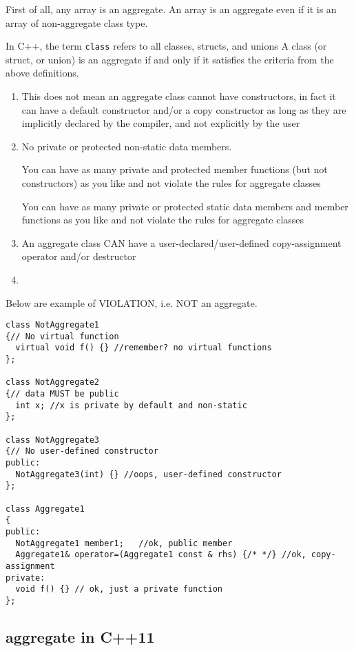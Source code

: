 First of all, any array is an aggregate. An array is an aggregate even if it is
an array of non-aggregate class type.

In C++, the term \verb!class! refers to all classes, structs, and unions A class
(or struct, or union) is an aggregate if and only if it satisfies the criteria
from the above definitions.
\begin{enumerate}
  \item This does not mean an aggregate class cannot have constructors, in
  fact it can have a default constructor and/or a copy constructor as long as
  they are implicitly declared by the compiler, and not explicitly by the user  
  
  \item No private or protected non-static data members. 
  
  You can have as many private and protected member functions (but not
  constructors) as you like and not violate the rules for aggregate classes
  
  You can have as many private or protected static data members and member
  functions as you like and not violate the rules for aggregate classes
  
  \item An aggregate class CAN have a user-declared/user-defined copy-assignment
  operator and/or destructor
  
  \item 
\end{enumerate}

Below are example of VIOLATION, i.e. NOT an aggregate.
\begin{lstlisting}
class NotAggregate1
{// No virtual function
  virtual void f() {} //remember? no virtual functions
};

class NotAggregate2
{// data MUST be public 
  int x; //x is private by default and non-static 
};

class NotAggregate3
{// No user-defined constructor
public:
  NotAggregate3(int) {} //oops, user-defined constructor
};

class Aggregate1
{
public:
  NotAggregate1 member1;   //ok, public member
  Aggregate1& operator=(Aggregate1 const & rhs) {/* */} //ok, copy-assignment  
private:
  void f() {} // ok, just a private function
};
\end{lstlisting}


\subsection{aggregate in C++11}
\label{sec:aggregate-class-C++11}


